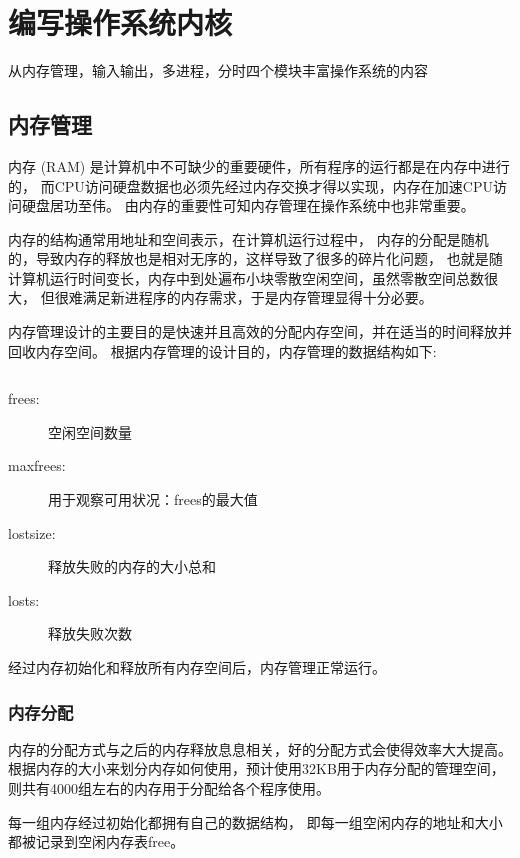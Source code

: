 \chapter{编写操作系统内核}

从内存管理，输入输出，多进程，分时四个模块丰富操作系统的内容

\section{内存管理}

内存 (RAM) 是计算机中不可缺少的重要硬件，所有程序的运行都是在内存中进行的，
而CPU访问硬盘数据也必须先经过内存交换才得以实现，内存在加速CPU访问硬盘居功至伟。
由内存的重要性可知内存管理在操作系统中也非常重要。	

内存的结构通常用地址和空间表示，在计算机运行过程中，
内存的分配是随机的，导致内存的释放也是相对无序的，这样导致了很多的碎片化问题，
也就是随计算机运行时间变长，内存中到处遍布小块零散空闲空间，虽然零散空间总数很大，
但很难满足新进程序的内存需求，于是内存管理显得十分必要。

内存管理设计的主要目的是快速并且高效的分配内存空间，并在适当的时间释放并回收内存空间。
根据内存管理的设计目的，内存管理的数据结构如下:

\begin{listing}[H]
  \inputminted[tabsize=2, firstline=137, lastline=143,
  linenos=true]{c}{../ZOS/src/kernel/bootpack.h}
\end{listing}

\begin{description}
\item[frees:]空闲空间数量
\item[maxfrees:]用于观察可用状况：frees的最大值
\item[lostsize:]释放失败的内存的大小总和
\item[losts:]释放失败次数
\end{description}

经过内存初始化和释放所有内存空间后，内存管理正常运行。

\newpage
\subsection{内存分配}

内存的分配方式与之后的内存释放息息相关，好的分配方式会使得效率大大提高。
根据内存的大小来划分内存如何使用，预计使用32KB用于内存分配的管理空间，
则共有4000组左右的内存用于分配给各个程序使用。

每一组内存经过初始化都拥有自己的数据结构，
即每一组空闲内存的地址和大小都被记录到空闲内存表free。

